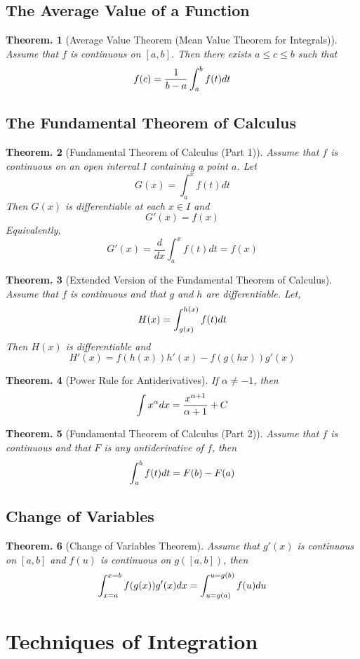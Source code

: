 \documentclass[11pt, a4paper]{memoir}
\theoremstyle{change}
\newtheorem{theorem}{Theorem.}[section]
\theoremstyle{plain}
\theoremstyle{nonumberplain}
\numberwithin{equation}{section}
\begin{document}
\section{The Average Value of a Function}
\begin{theorem}[Average Value Theorem (Mean Value Theorem for Integrals)]
    Assume that $f$ is continuous on $[a, b]$. Then there exists $a \le c \le b$ such that $$f(c) = \dfrac{1}{b-a}\int^b_af(t) \space dt$$
\end{theorem}
\section{The Fundamental Theorem of Calculus}
\begin{theorem}[Fundamental Theorem of Calculus (Part 1)]
    Assume that $f$ is continuous on an open interval $I$ containing a point $a$. Let $$G(x) =  \int^x_a f(t) dt$$Then $G(x)$ is differentiable at each $x \in I$ and $$G'(x) = f(x)$$ Equivalently, $$G'(x) = \dfrac{d}{dx}\int^x_a f(t) dt = f(x)$$
\end{theorem}
\begin{theorem}[Extended Version of the Fundamental Theorem of Calculus]
    Assume that $f$ is continuous and that $g$ and $h$ are differentiable. Let, $$H(x) = \int^{h(x)}_{g(x)}f(t) \space dt$$ Then $H(x)$ is differentiable and $$H'(x) = f(h(x)) h'(x) - f(g(hx))g'(x)$$
\end{theorem}
\begin{theorem}[Power Rule for Antiderivatives]
    If $\alpha \ne -1$, then $$\int x^\alpha \space dx = \dfrac{x^{\alpha + 1}}{\alpha + 1} + C$$
\end{theorem}
\begin{theorem}[Fundamental Theorem of Calculus (Part 2)]
    Assume that $f$ is continuous and that $F$ is any antiderivative of $f$, then $$\int^b_a f(t)\space dt = F(b) - F(a)$$
\end{theorem}
\section{Change of Variables}
\begin{theorem}[Change of Variables Theorem]
Assume that $g'(x)$ is continuous on $[a,b]$ and $f(u)$ is continuous on $g([a,b])$,  then $$\int^{x=b}_{x=a} f(g(x))g'(x) \space dx = \int^{u = g(b)}_{u = g(a)} f(u) \space du$$
\end{theorem}

\chapter{Techniques of Integration}
\end{document}
